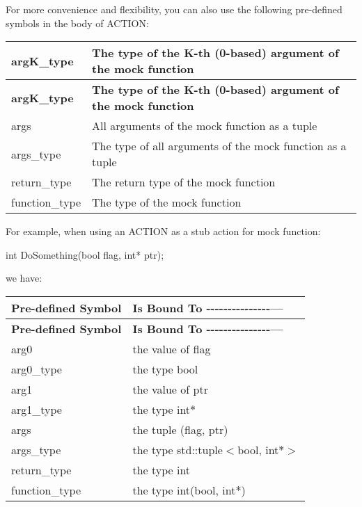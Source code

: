 For more convenience and flexibility, you can also use the following pre-\/defined symbols in the body of {\ttfamily A\+C\+T\+I\+ON}\+:

\tabulinesep=1mm
\begin{longtabu} spread 0pt [c]{*{2}{|X[-1]}|}
\hline
\rowcolor{\tableheadbgcolor}\textbf{ {\ttfamily arg\+K\+\_\+type}  }&\textbf{ The type of the K-\/th (0-\/based) argument of the mock function   }\\
\endfirsthead
\hline
\endfoot
\hline
\rowcolor{\tableheadbgcolor}\textbf{ {\ttfamily arg\+K\+\_\+type}  }&\textbf{ The type of the K-\/th (0-\/based) argument of the mock function   }\\
\endhead
{\ttfamily args}  &All arguments of the mock function as a tuple   \\
{\ttfamily args\+\_\+type}  &The type of all arguments of the mock function as a tuple   \\
{\ttfamily return\+\_\+type}  &The return type of the mock function   \\
{\ttfamily function\+\_\+type}  &The type of the mock function   \\
\end{longtabu}


For example, when using an {\ttfamily A\+C\+T\+I\+ON} as a stub action for mock function\+:


\begin{DoxyCode}
\textcolor{keywordtype}{int} DoSomething(\textcolor{keywordtype}{bool} flag, \textcolor{keywordtype}{int}* ptr);
\end{DoxyCode}


we have\+:

\tabulinesep=1mm
\begin{longtabu} spread 0pt [c]{*{2}{|X[-1]}|}
\hline
\rowcolor{\tableheadbgcolor}\textbf{ Pre-\/defined Symbol  }&\textbf{ Is Bound To -\/-\/-\/-\/-\/-\/-\/-\/-\/-\/-\/-\/-\/-\/-\/---   }\\
\endfirsthead
\hline
\endfoot
\hline
\rowcolor{\tableheadbgcolor}\textbf{ Pre-\/defined Symbol  }&\textbf{ Is Bound To -\/-\/-\/-\/-\/-\/-\/-\/-\/-\/-\/-\/-\/-\/-\/---   }\\
\endhead
{\ttfamily arg0}  &the value of {\ttfamily flag}   \\
{\ttfamily arg0\+\_\+type}  &the type {\ttfamily bool}   \\
{\ttfamily arg1}  &the value of {\ttfamily ptr}   \\
{\ttfamily arg1\+\_\+type}  &the type {\ttfamily int$\ast$}   \\
{\ttfamily args}  &the tuple {\ttfamily (flag, ptr)}   \\
{\ttfamily args\+\_\+type}  &the type {\ttfamily std\+::tuple$<$bool, int$\ast$$>$}   \\
{\ttfamily return\+\_\+type}  &the type {\ttfamily int}   \\
{\ttfamily function\+\_\+type}  &the type {\ttfamily int(bool, int$\ast$)}   \\
\end{longtabu}


